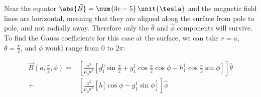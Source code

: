 \documentclass{article}
\begin{document}
{\begin{enumerate}
		Near the equator $\abs{\vec{B}} = \num{3e-5} \, \unit{\tesla}$ and the magnetic field lines are horizontal, meaning that they are aligned along the surface from pole to pole, and not radially away. Therefore only the $\hat{\theta}$ and $\hat{\phi}$ components will survive. To find the Gauss coefficients for this case at the surface, we can take $r = a$, $\theta = \frac{\pi}{2}$, and $\phi$ would range from $0$ to $2\pi$:
		
		
		\begin{equation*}
			\begin{split}
				\vec{B}\left(a,\frac{\pi}{2},\phi\right) = &\left[ \frac{a^3}{\mu_0 a^3} \left[ g^0_1 \sin \frac{\pi}{2} + g^1_1 \cos \frac{\pi}{2} \cos \phi + h^1_1 \cos \frac{\pi}{2} \sin \phi \right] \right] \hat{\theta} \\
				+ &\left[ \frac{a^3}{\mu_0 a^3} \left[ h^1_1 \cos \phi - g^1_1 \sin \phi \right] \right] \hat{\phi}
			\end{split}
		\end{equation*}
		
		

\end{enumerate}}
\end{document}
